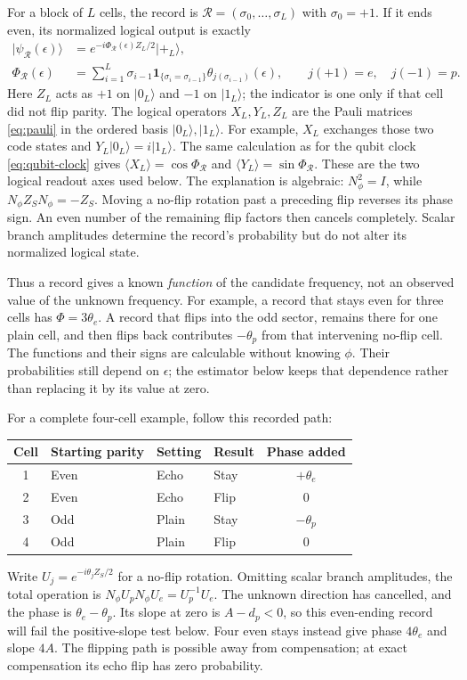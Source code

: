 \documentclass[11pt,a4paper]{article}
\numberwithin{equation}{section}
\theoremstyle{remark}
\begin{document}
For a block of $L$ cells, the record is
$\mathcal R=(\sigma_0,\ldots,\sigma_L)$ with $\sigma_0=+1$.
If it ends even, its normalized logical output is exactly
\begin{align}
 |\psi_{\mathcal R}(\epsilon)\rangle
 &=e^{-i\Phi_{\mathcal R}(\epsilon)Z_L/2}|+_L\rangle,\nonumber\\
 \Phi_{\mathcal R}(\epsilon)
 &=\sum_{i=1}^L\sigma_{i-1}
    \mathbf1_{\{\sigma_i=\sigma_{i-1}\}}
    \theta_{j(\sigma_{i-1})}(\epsilon),
 \qquad j(+1)=e,\quad j(-1)=p.
 \label{con:recordphase}
\end{align}
Here $Z_L$ acts as $+1$ on $|0_L\rangle$ and $-1$ on $|1_L\rangle$;
the indicator is one only if that cell did not flip parity.
The logical operators $X_L,Y_L,Z_L$ are the Pauli matrices
\eqref{eq:pauli} in the ordered basis $|0_L\rangle,|1_L\rangle$.
For example, $X_L$ exchanges those two code states and
$Y_L|0_L\rangle=i|1_L\rangle$.
The same calculation as for the qubit clock \eqref{eq:qubit-clock}
gives $\langle X_L\rangle=\cos\Phi_{\mathcal R}$ and
$\langle Y_L\rangle=\sin\Phi_{\mathcal R}$. These are the two
logical readout axes used below.
The explanation is algebraic: $N_\phi^2=I$, while
$N_\phi Z_SN_\phi=-Z_S$. Moving a no-flip rotation past a preceding
flip reverses its phase sign. An even number of the remaining flip factors
then cancels completely. Scalar branch amplitudes determine the record's
probability but do not alter its normalized logical state.

Thus a record gives a known \emph{function} of the candidate frequency,
not an observed value of the unknown frequency. For example, a record
that stays even for three cells has $\Phi=3\theta_e$. A record that
flips into the odd sector, remains there for one plain cell, and then
flips back contributes $-\theta_p$ from that intervening no-flip cell.
The functions and their signs are calculable without knowing $\phi$.
Their probabilities still depend on $\epsilon$; the estimator below keeps
that dependence rather than replacing it by its value at zero.

For a complete four-cell example, follow this recorded path:
\begin{center}
\begin{tabular}{@{}clllc@{}}
\toprule
Cell & Starting parity & Setting & Result & Phase added\\
\midrule
1 & Even & Echo & Stay & $+\theta_e$\\
2 & Even & Echo & Flip & $0$\\
3 & Odd & Plain & Stay & $-\theta_p$\\
4 & Odd & Plain & Flip & $0$\\
\bottomrule
\end{tabular}
\end{center}
Write $U_j=e^{-i\theta_jZ_S/2}$ for a no-flip rotation. Omitting scalar
branch amplitudes, the total operation is
$N_\phi U_pN_\phi U_e=U_p^{-1}U_e$. The unknown direction has
cancelled, and the phase is $\theta_e-\theta_p$. Its slope at zero is
$A-d_p<0$, so this even-ending record will fail the positive-slope
test below. Four even stays instead give phase $4\theta_e$ and slope
$4A$. The flipping path is possible away from compensation; at exact
compensation its echo flip has zero probability.
\end{document}
